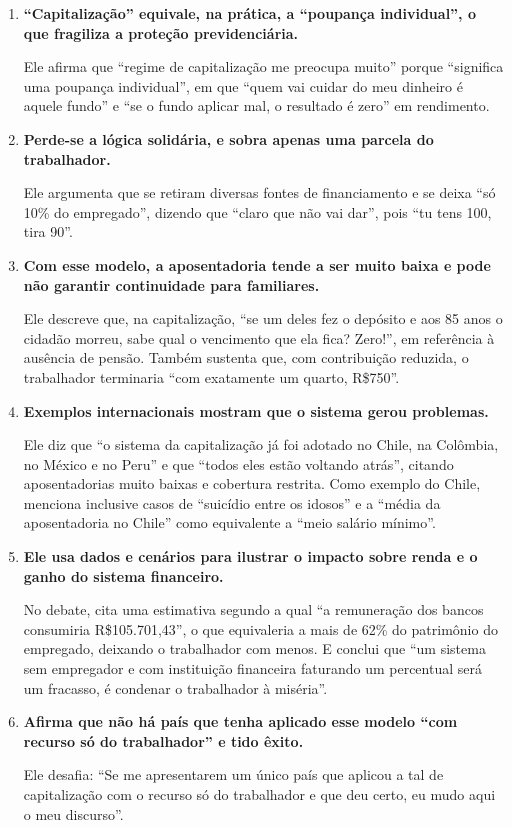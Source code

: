 \begin{enumerate}
  \item \textbf{``Capitalização'' equivale, na prática, a ``poupança individual'', o que fragiliza a proteção previdenciária.}

  Ele afirma que ``regime de capitalização me preocupa muito'' porque ``significa uma poupança individual'', em que ``quem vai cuidar do meu dinheiro é aquele fundo'' e ``se o fundo aplicar mal, o resultado é zero'' em rendimento.

  \item \textbf{Perde-se a lógica solidária, e sobra apenas uma parcela do trabalhador.}

  Ele argumenta que se retiram diversas fontes de financiamento e se deixa ``só 10\% do empregado'', dizendo que ``claro que não vai dar'', pois ``tu tens 100, tira 90''.

  \item \textbf{Com esse modelo, a aposentadoria tende a ser muito baixa e pode não garantir continuidade para familiares.}

  Ele descreve que, na capitalização, ``se um deles fez o depósito e aos 85 anos o cidadão morreu, sabe qual o vencimento que ela fica? Zero!'', em referência à ausência de pensão. Também sustenta que, com contribuição reduzida, o trabalhador terminaria ``com exatamente um quarto, R\$750''.

  \item \textbf{Exemplos internacionais mostram que o sistema gerou problemas.}

  Ele diz que ``o sistema da capitalização já foi adotado no Chile, na Colômbia, no México e no Peru'' e que ``todos eles estão voltando atrás'', citando aposentadorias muito baixas e cobertura restrita. Como exemplo do Chile, menciona inclusive casos de ``suicídio entre os idosos'' e a ``média da aposentadoria no Chile'' como equivalente a ``meio salário mínimo''.

  \item \textbf{Ele usa dados e cenários para ilustrar o impacto sobre renda e o ganho do sistema financeiro.}

  No debate, cita uma estimativa segundo a qual ``a remuneração dos bancos consumiria R\$105.701,43'', o que equivaleria a mais de 62\% do patrimônio do empregado, deixando o trabalhador com menos. E conclui que ``um sistema sem empregador e com instituição financeira faturando um percentual será um fracasso, é condenar o trabalhador à miséria''.

  \item \textbf{Afirma que não há país que tenha aplicado esse modelo ``com recurso só do trabalhador'' e tido êxito.}

  Ele desafia: ``Se me apresentarem um único país que aplicou a tal de capitalização com o recurso só do trabalhador e que deu certo, eu mudo aqui o meu discurso''.
\end{enumerate}

